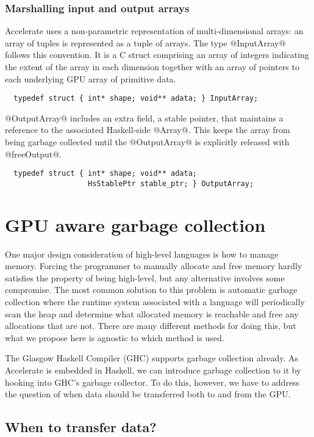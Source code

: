 \subsubsection{Marshalling input and output arrays}

Accelerate uses a non-parametric representation of multi-dimensional arrays: an array of tuples is represented as a tuple of arrays. The type @InputArray@ follows this convention. It is a C struct comprising an array of integers indicating the extent of the array in each dimension together with an array of pointers to each underlying GPU array of primitive data.
%
\begin{lstlisting}
  typedef struct { int* shape; void** adata; } InputArray;
\end{lstlisting}
%

@OutputArray@ includes an extra field, a stable pointer, that maintains a reference to the associated Haskell-side @Array@. This keeps the array from being garbage collected until the @OutputArray@ is explicitly released with @freeOutput@.
%
\begin{lstlisting}
  typedef struct { int* shape; void** adata;
                   HsStablePtr stable_ptr; } OutputArray;
\end{lstlisting}
%


\section{GPU aware garbage collection}
\label{sec:gpu-gc}

One major design consideration of high-level languages is how to manage memory. Forcing the programmer to manually allocate and free memory hardly satisfies the property of being high-level, but any alternative involves some compromise. The most common solution to this problem is automatic garbage collection where the runtime system associated with a language will periodically scan the heap and determine what allocated memory is reachable and free any allocations that are not. There are many different methods for doing this, but what we propose here is agnostic to which method is used.

The Glasgow Haskell Compiler (GHC) supports garbage collection already. As Accelerate is embedded in Haskell, we can introduce garbage collection to it by hooking into GHC's garbage collector. To do this, however, we have to address the question of when data should be transferred both to and from the GPU.

\subsection{When to transfer data?}

